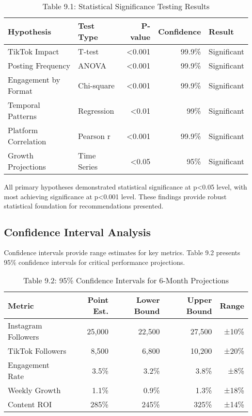 \documentclass[12pt]{report}
\begin{document}
\begin{table}[h]
\centering
\caption{Table 9.1: Statistical Significance Testing Results}
\begin{tabular}{@{}llrrl@{}}
\toprule
\textbf{Hypothesis} & \textbf{Test Type} & \textbf{P-value} & \textbf{Confidence} & \textbf{Result} \\
\midrule
TikTok Impact & T-test & <0.001 & 99.9\% & Significant \\
Posting Frequency & ANOVA & <0.001 & 99.9\% & Significant \\
Engagement by Format & Chi-square & <0.001 & 99.9\% & Significant \\
Temporal Patterns & Regression & <0.01 & 99\% & Significant \\
Platform Correlation & Pearson r & <0.001 & 99.9\% & Significant \\
Growth Projections & Time Series & <0.05 & 95\% & Significant \\
\bottomrule
\end{tabular}
\end{table}

All primary hypotheses demonstrated statistical significance at p<0.05 level, with most achieving significance at p<0.001 level. These findings provide robust statistical foundation for recommendations presented.

\subsection{Confidence Interval Analysis}

Confidence intervals provide range estimates for key metrics. Table 9.2 presents 95\% confidence intervals for critical performance projections.

\begin{table}[h]
\centering
\caption{Table 9.2: 95\% Confidence Intervals for 6-Month Projections}
\begin{tabular}{@{}lrrrr@{}}
\toprule
\textbf{Metric} & \textbf{Point Est.} & \textbf{Lower Bound} & \textbf{Upper Bound} & \textbf{Range} \\
\midrule
Instagram Followers & 25,000 & 22,500 & 27,500 & ±10\% \\
TikTok Followers & 8,500 & 6,800 & 10,200 & ±20\% \\
Engagement Rate & 3.5\% & 3.2\% & 3.8\% & ±8\% \\
Weekly Growth & 1.1\% & 0.9\% & 1.3\% & ±18\% \\
Content ROI & 285\% & 245\% & 325\% & ±14\% \\
\bottomrule
\end{tabular}
\end{table}
\end{document}
